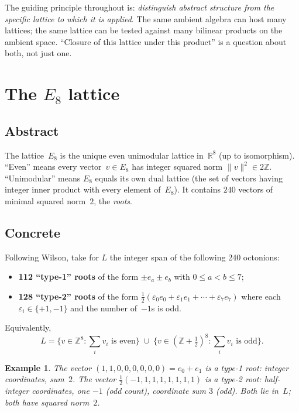 \documentclass[11pt]{amsart}
\newcommand{\ZZ}{\mathbb{Z}}
\newcommand{\RR}{\mathbb{R}}
\newtheorem{example}{Example}[section]
\begin{document}
The guiding principle throughout is: \emph{distinguish abstract
structure from the specific lattice to which it is applied}.  The
same ambient algebra can host many lattices; the same lattice can
be tested against many bilinear products on the ambient space.
``Closure of this lattice under this product'' is a question about
both, not just one.

\section{The $E_8$ lattice}\label{sec:e8}

\subsection*{Abstract}

The lattice~$E_8$ is the unique even unimodular lattice in~$\RR^8$
(up to isomorphism).  ``Even'' means every vector~$v \in E_8$ has
integer squared norm $\|v\|^2 \in 2\ZZ$.  ``Unimodular'' means
$E_8$ equals its own dual lattice (the set of vectors having
integer inner product with every element of~$E_8$).  It contains
$240$ vectors of minimal squared norm~$2$, the \emph{roots}.

\subsection*{Concrete}

Following Wilson, take for $L$ the integer span of the following
240 octonions:
\begin{itemize}
\item \textbf{112 ``type-1'' roots} of the form
  $\pm e_a \pm e_b$ with $0 \le a < b \le 7$;
\item \textbf{128 ``type-2'' roots} of the form
  $\tfrac{1}{2}(\varepsilon_0 e_0 + \varepsilon_1 e_1 + \cdots
  + \varepsilon_7 e_7)$ where each
  $\varepsilon_i \in \{+1, -1\}$ and the number of~$-1$s is odd.
\end{itemize}

Equivalently,
\[
  L = \{v \in \ZZ^8 : \sum_i v_i \text{ is even}\}
   \;\cup\;
      \{v \in (\ZZ + \tfrac{1}{2})^8 : \sum_i v_i \text{ is odd}\}.
\]

\begin{example}
The vector $(1, 1, 0, 0, 0, 0, 0, 0) = e_0 + e_1$ is a type-1 root:
integer coordinates, sum~$2$.  The vector
$\tfrac{1}{2}(-1, 1, 1, 1, 1, 1, 1, 1)$ is a type-2 root:
half-integer coordinates, one $-1$ (odd count), coordinate sum $3$
(odd).  Both lie in~$L$; both have squared norm~$2$.
\end{example}
\end{document}
